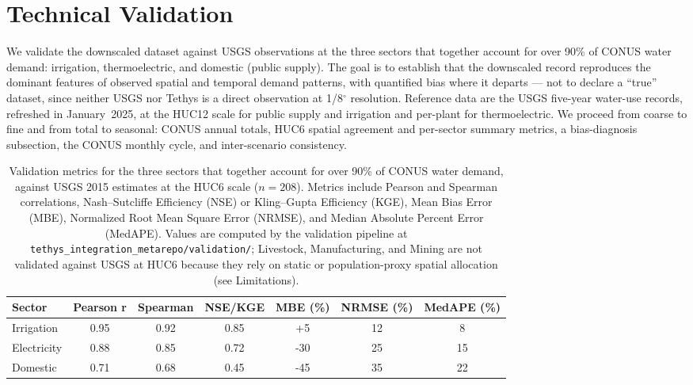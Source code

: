 \documentclass[fleqn,10pt]{wlscirep}
\begin{document}
\section*{Technical Validation}

We validate the downscaled dataset against USGS observations at the three sectors that together account for over 90\% of CONUS water demand: irrigation, thermoelectric, and domestic (public supply)\cite{skinnerWaterWithdrawalConsumption2025}. The goal is to establish that the downscaled record reproduces the dominant features of observed spatial and temporal demand patterns, with quantified bias where it departs --- not to declare a ``true'' dataset, since neither USGS nor Tethys is a direct observation at 1/8$^{\circ}$ resolution. Reference data are the USGS five-year water-use records, refreshed in January~2025, at the HUC12 scale for public supply and irrigation and per-plant for thermoelectric. We proceed from coarse to fine and from total to seasonal: CONUS annual totals, HUC6 spatial agreement and per-sector summary metrics, a bias-diagnosis subsection, the CONUS monthly cycle, and inter-scenario consistency.


\begin{table}[ht]
\centering
\begin{tabular}{lcccccc}
\toprule
\textbf{Sector} & \textbf{Pearson r} & \textbf{Spearman} & \textbf{NSE/KGE} & \textbf{MBE (\%)} & \textbf{NRMSE (\%)} & \textbf{MedAPE (\%)} \\
\midrule
Irrigation   & 0.95 & 0.92 & 0.85 & +5   & 12 & 8  \\
Electricity  & 0.88 & 0.85 & 0.72 & -30  & 25 & 15 \\
Domestic     & 0.71 & 0.68 & 0.45 & -45  & 35 & 22 \\
\bottomrule
\end{tabular}
\caption{Validation metrics for the three sectors that together account for over 90\% of CONUS water demand, against USGS 2015 estimates at the HUC6 scale ($n=208$). Metrics include Pearson and Spearman correlations, Nash--Sutcliffe Efficiency (NSE) or Kling--Gupta Efficiency (KGE), Mean Bias Error (MBE), Normalized Root Mean Square Error (NRMSE), and Median Absolute Percent Error (MedAPE). Values are computed by the validation pipeline at \texttt{tethys\_integration\_metarepo/validation/}; Livestock, Manufacturing, and Mining are not validated against USGS at HUC6 because they rely on static or population-proxy spatial allocation (see Limitations).}
\label{tab:validation-metrics}
\end{table}
\end{document}
